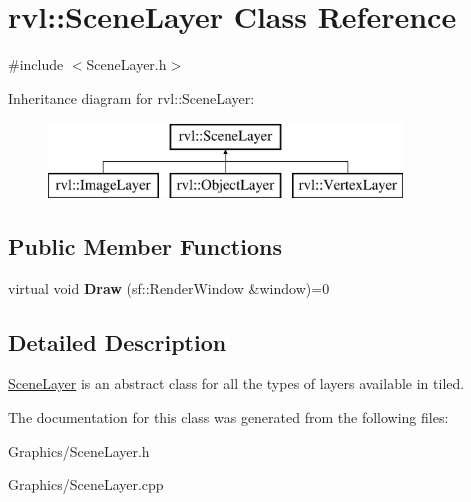 \hypertarget{classrvl_1_1_scene_layer}{}\section{rvl\+:\+:Scene\+Layer Class Reference}
\label{classrvl_1_1_scene_layer}


{\ttfamily \#include $<$Scene\+Layer.\+h$>$}

Inheritance diagram for rvl\+:\+:Scene\+Layer\+:\begin{figure}[H]
\begin{center}
\leavevmode
\includegraphics[height=2.000000cm]{classrvl_1_1_scene_layer}
\end{center}
\end{figure}
\subsection*{Public Member Functions}
\begin{DoxyCompactItemize}
\item 
\mbox{\label{classrvl_1_1_scene_layer_aaaf36766d7c6990f82bad34c7c57259d}} 
virtual void {\bfseries Draw} (sf\+::\+Render\+Window \&window)=0
\end{DoxyCompactItemize}


\subsection{Detailed Description}
\hyperlink{classrvl_1_1_scene_layer}{Scene\+Layer} is an abstract class for all the types of layers available in tiled. 

The documentation for this class was generated from the following files\+:\begin{DoxyCompactItemize}
\item 
Graphics/Scene\+Layer.\+h\item 
Graphics/Scene\+Layer.\+cpp\end{DoxyCompactItemize}
